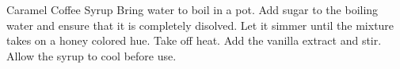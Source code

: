 \documentclass[../main.tex]{subfiles}
\begin{document}
\begin{recipe}{Caramel Coffee Syrup}{}{}
    Bring water to boil in a pot.
    Add sugar to the boiling water and ensure that it is completely disolved.
    Let it simmer until the mixture takes on a honey colored hue. Take off heat.
    Add the vanilla extract and stir. Allow the syrup to cool before use.
\end{recipe}
\end{document}
